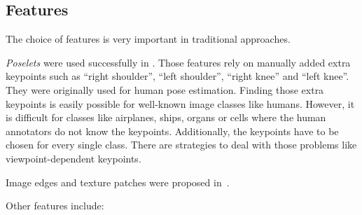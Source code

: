 
\subsection{Features}\label{subsec:features}%
The choice of features is very important in traditional approaches.

\textit{Poselets} were used successfully in \cite{bourdev2010detecting,brox2011object}.
Those features rely on manually added extra keypoints such as \enquote{right
shoulder}, \enquote{left shoulder}, \enquote{right knee} and \enquote{left
knee}. They were originally used for human pose estimation. Finding those extra
keypoints is easily possible for well-known image classes like humans. However,
it is difficult for classes like airplanes, ships, organs or cells where the
human annotators do not know the keypoints. Additionally, the keypoints have to
be chosen for every single class. There are strategies to deal with those
problems like viewpoint-dependent keypoints.

Image edges and texture patches were proposed in~\cite{brox2011object}.

Other features include:

